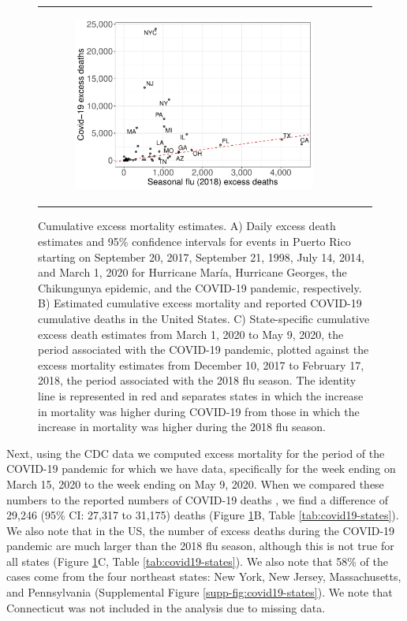 \documentclass[11pt]{article}
\begin{document}
\begin{figure}[ht]
\begin{tabular}{lll}
\begin{subfigure}[t]{0.3\linewidth}
		\includegraphics[width=1\linewidth]{figs/figure-2c.pdf}
	\end{subfigure}\\
	\end{tabular}
    \caption{Cumulative excess mortality estimates. A) Daily excess death estimates and 95\% confidence intervals for events in Puerto Rico starting on September 20, 2017, September 21, 1998, July 14, 2014, and March 1, 2020 for Hurricane Mar\'ia, Hurricane Georges, the Chikungunya epidemic, and the COVID-19 pandemic, respectively.  B) Estimated cumulative excess mortality and reported COVID-19 cumulative deaths in the United States. C) State-specific cumulative excess death estimates from March 1, 2020 to May 9, 2020, the period associated with the COVID-19 pandemic, plotted against the excess mortality estimates from December 10, 2017 to February 17, 2018, the period associated with the 2018 flu season. The identity line is represented in red and separates states in which the increase in mortality was higher during COVID-19 from those in which the increase in mortality was higher during the 2018 flu season.}
    \label{fig:excess-deaths}
\end{figure}

Next, using the CDC data we computed excess mortality for the period of the COVID-19 pandemic for which we have data, specifically for the week ending on March 15, 2020 to the week ending on May 9, 2020. When we compared these numbers to the reported numbers of COVID-19 deaths \cite{smith2020coronavirus}, we find a difference of 29,246 (95\% CI: 27,317 to 31,175) deaths (Figure \ref{fig:excess-deaths}B, Table \ref{tab:covid19-states}). We also note that in the US, the number of excess deaths during the COVID-19 pandemic are much larger than the 2018 flu season, although this is not true for all states (Figure \ref{fig:excess-deaths}C, Table \ref{tab:covid19-states}). We also note that 58\% of the cases come from the four northeast states: New York, New Jersey, Massachusetts, and Pennsylvania (Supplemental Figure \ref{supp-fig:covid19-states}). We note that Connecticut was not included in the analysis due to missing data.
\end{document}
